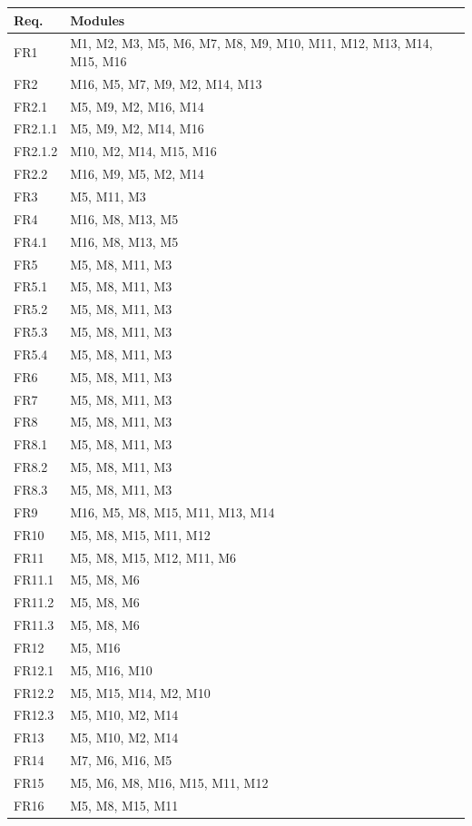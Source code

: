 \documentclass[12pt, titlepage]{article}
\begin{document}
\newpage
\begin{longtable}[h]{p{} p{}}
\toprule
\textbf{Req.} & \textbf{Modules}\\
\midrule
FR1 & M1, M2, M3, M5, M6, M7, M8, M9, M10, M11, M12, M13, M14, M15, M16\\
FR2 & M16, M5, M7, M9, M2, M14, M13\\
FR2.1 & M5, M9, M2, M16, M14\\
FR2.1.1 & M5, M9, M2, M14, M16\\
FR2.1.2 & M10, M2, M14, M15, M16\\
FR2.2 & M16, M9, M5, M2, M14\\
FR3 & M5, M11, M3\\
FR4 & M16, M8, M13, M5\\
FR4.1 & M16, M8, M13, M5\\
FR5 & M5, M8, M11, M3\\
FR5.1 & M5, M8, M11, M3\\
FR5.2 & M5, M8, M11, M3\\
FR5.3 & M5, M8, M11, M3\\
FR5.4 & M5, M8, M11, M3\\
FR6 & M5, M8, M11, M3\\
FR7 & M5, M8, M11, M3\\
FR8 & M5, M8, M11, M3\\
FR8.1 & M5, M8, M11, M3\\
FR8.2 & M5, M8, M11, M3\\
FR8.3 & M5, M8, M11, M3\\
FR9 & M16, M5, M8, M15, M11, M13, M14\\
FR10 & M5, M8, M15, M11, M12\\
FR11 & M5, M8, M15, M12, M11, M6\\
FR11.1 & M5, M8, M6\\
FR11.2 & M5, M8, M6\\
FR11.3 & M5, M8, M6\\
FR12 & M5, M16\\
FR12.1 & M5, M16, M10\\
FR12.2 & M5, M15, M14, M2, M10\\
FR12.3 & M5, M10, M2, M14\\
FR13 & M5, M10, M2, M14\\
FR14 & M7, M6, M16, M5\\
FR15 & M5, M6, M8, M16, M15, M11, M12\\
FR16 & M5, M8, M15, M11\\

\end{longtable}
\end{document}
